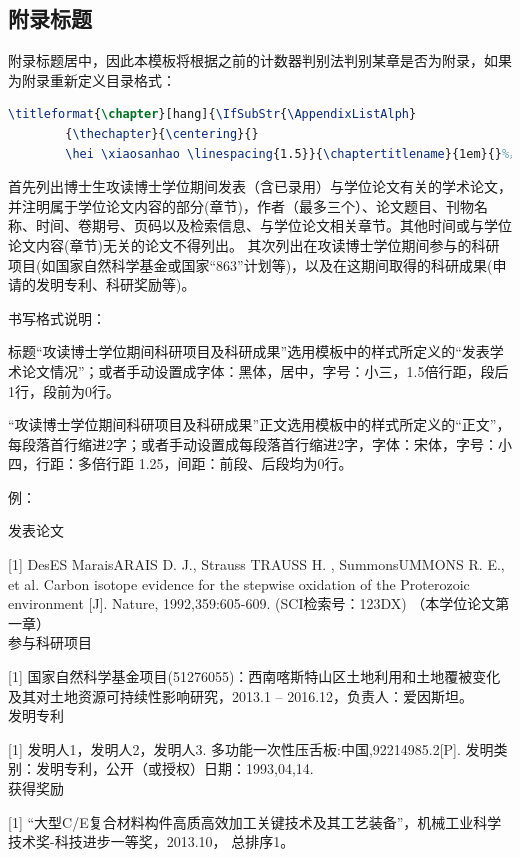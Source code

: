 \documentclass[doctor]{dutthesis} %
\begin{document}
\begin{Appendix}
    \section{附录标题}
    附录标题居中，因此本模板将根据之前的计数器判别法判别某章是否为附录，如果为附录重新定义目录格式：
    \begin{lstlisting}[language=TeX]
	    \titleformat{\chapter}[hang]{\IfSubStr{\AppendixListAlph}
	    {\thechapter}{\centering}{}
	    \hei \xiaosanhao \linespacing{1.5}}{\chaptertitlename}{1em}{}%黑体 小三
    \end{lstlisting}
\end{Appendix}
\begin{Reference}

\end{Reference}
\begin{Publics}
    首先列出博士生攻读博士学位期间发表（含已录用）与学位论文有关的学术论文，并注明属于学位论文内容的部分(章节)，作者（最多三个）、论文题目、刊物名称、时间、卷期号、页码以及检索信息、与学位论文相关章节。其他时间或与学位论文内容(章节)无关的论文不得列出。
其次列出在攻读博士学位期间参与的科研项目(如国家自然科学基金或国家“863”计划等)，以及在这期间取得的科研成果(申请的发明专利、科研奖励等)。

书写格式说明：

标题“攻读博士学位期间科研项目及科研成果”选用模板中的样式所定义的“发表学术论文情况”；或者手动设置成字体：黑体，居中，字号：小三，1.5倍行距，段后1行，段前为0行。

“攻读博士学位期间科研项目及科研成果”正文选用模板中的样式所定义的“正文”，每段落首行缩进2字；或者手动设置成每段落首行缩进2字，字体：宋体，字号：小四，行距：多倍行距 1.25，间距：前段、后段均为0行。

例：

发表论文

[1] DesES MaraisARAIS D. J., Strauss TRAUSS H. , SummonsUMMONS R. E., et al. Carbon isotope evidence for the stepwise oxidation of the Proterozoic environment [J]. Nature, 1992,359:605-609. (SCI检索号：123DX) （本学位论文第一章）
~\\

参与科研项目

[1] 国家自然科学基金项目(51276055)：西南喀斯特山区土地利用和土地覆被变化及其对土地资源可持续性影响研究，2013.1 – 2016.12，负责人：爱因斯坦。
~\\

发明专利

[1] 发明人1，发明人2，发明人3. 多功能一次性压舌板:中国,92214985.2[P]. 发明类别：发明专利，公开（或授权）日期：1993,04,14.
~\\


获得奖励

[1] “大型C/E复合材料构件高质高效加工关键技术及其工艺装备”，机械工业科学技术奖-科技进步一等奖，2013.10， 总排序1。
\end{Publics}
\end{document}
